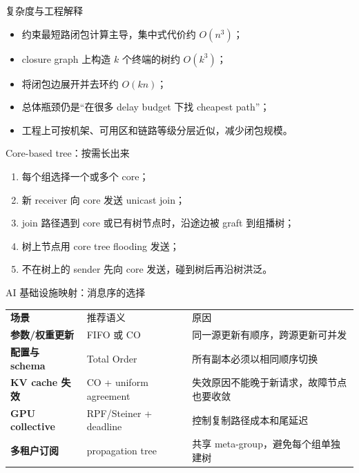 \documentclass[UTF8,fontset=none,aspectratio=169,10pt]{beamer}
\begin{document}
{\begin{frame}{复杂度与工程解释}
\begin{itemize}
  \item 约束最短路闭包计算主导，集中式代价约 $O(n^3)$；
  \item closure graph 上构造 $k$ 个终端的树约 $O(k^3)$；
  \item 将闭包边展开并去环约 $O(kn)$；
  \item 总体瓶颈仍是“在很多 delay budget 下找 cheapest path”；
  \item 工程上可按机架、可用区和链路等级分层近似，减少闭包规模。
\end{itemize}
\end{frame}


\begin{frame}{Core-based tree：按需长出来}
\begin{enumerate}
  \item 每个组选择一个或多个 core；
  \item 新 receiver 向 core 发送 unicast join；
  \item join 路径遇到 core 或已有树节点时，沿途边被 graft 到组播树；
  \item 树上节点用 core tree flooding 发送；
  \item 不在树上的 sender 先向 core 发送，碰到树后再沿树洪泛。
\end{enumerate}
\vfill
{}
\end{frame}

\begin{frame}{AI 基础设施映射：消息序的选择}
\begin{tabularx}{\linewidth}{>{\bfseries}p{2.8cm}XX}
\toprule
场景 & 推荐语义 & 原因 \\
参数/权重更新 & FIFO 或 CO & 同一源更新有顺序，跨源更新可并发 \\
配置与 schema & Total Order & 所有副本必须以相同顺序切换 \\
KV cache 失效 & CO + uniform agreement & 失效原因不能晚于新请求，故障节点也要收敛 \\
GPU collective & RPF/Steiner + deadline & 控制复制路径成本和尾延迟 \\
多租户订阅 & propagation tree & 共享 meta-group，避免每个组单独建树 \\
\bottomrule
\end{tabularx}
\end{frame}

}
\end{document}
